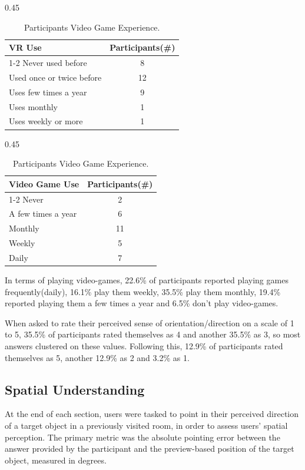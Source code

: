 \begin{table}[h]
\vspace{1em}

\begin{subtable}[t]{0.45\textwidth}
\centering
\caption{Participants VR Experience.}
\begin{tabular}{l|c}
VR Use & Participants(\#) \\
\cline{1-2}
Never used before & 8 \\
Used once or twice before  & 12 \\
Uses few times a year & 9 \\
Uses monthly & 1 \\
Uses weekly or more & 1 \\
\end{tabular}
\end{subtable}
\hfill
\begin{subtable}[t]{0.45\textwidth}
\centering
\caption{Participants Video Game Experience.}
\begin{tabular}{l|c}
Video Game Use & Participants(\#) \\
\cline{1-2}
Never & 2 \\
A few times a year  & 6 \\
Monthly & 11 \\
Weekly & 5 \\
Daily & 7 \\
\end{tabular}
\end{subtable}

\end{table}
In terms of playing video-games, 22.6\% of participants reported playing games frequently(daily), 16.1\% play them weekly, 35.5\% play them monthly, 19.4\% reported playing them a few times a year and 6.5\% don't play video-games.

When asked to rate their perceived sense of orientation/direction on a scale of 1 to 5, 35.5\% of participants rated themselves as 4 and another 35.5\% as 3, so most answers clustered on these values. Following this, 12.9\% of participants rated themselves as 5, another 12.9\% as 2 and 3.2\% as 1.

\subsection{Spatial Understanding}

At the end of each section, users were tasked to point in their perceived direction of a target object in a previously visited room, 
in order to assess users' spatial perception. The primary metric was the absolute pointing error between the answer provided by the 
participant and the preview-based position of the target object, measured in degrees.

